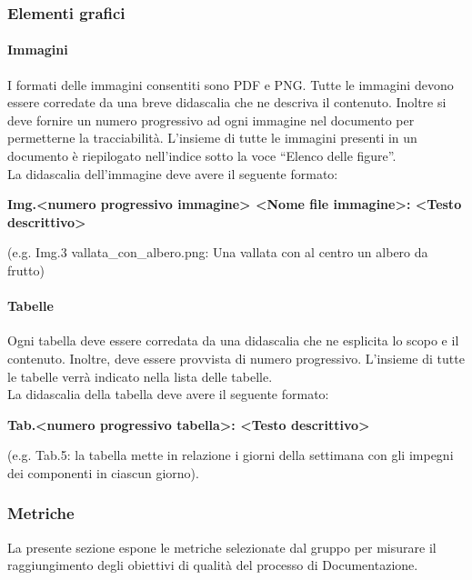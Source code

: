 		\subsubsection{Elementi grafici}
			\paragraph{Immagini}
				I formati delle immagini consentiti sono PDF e PNG. Tutte le immagini devono essere corredate da una breve didascalia che ne descriva il contenuto. Inoltre si deve fornire un numero progressivo ad ogni immagine nel documento per permetterne la tracciabilità. L’insieme di tutte le immagini presenti in un documento è riepilogato nell'indice sotto la voce “Elenco delle figure”. \\
				La didascalia dell’immagine deve avere il seguente formato:
				\begin{center}
					\textbf{Img.<numero progressivo immagine> <Nome file immagine>: <Testo descrittivo>}
				\end{center}
				(e.g.  Img.3 vallata\_con\_albero.png: Una vallata con al centro un albero da frutto)
			\paragraph{Tabelle}
				Ogni tabella deve essere corredata da una didascalia che ne esplicita lo scopo e il contenuto. Inoltre, deve essere provvista di numero progressivo. L’insieme di tutte le tabelle verrà indicato nella lista delle tabelle. \\
				La didascalia della tabella deve avere il seguente formato: \\
				\begin{center}
					\textbf{Tab.<numero progressivo tabella>: <Testo descrittivo>}
				\end{center}
				(e.g. Tab.5: la tabella mette in relazione i giorni della settimana con gli impegni dei componenti in ciascun giorno).

		\subsubsection{Metriche}
			La presente sezione espone le metriche selezionate dal gruppo per misurare il raggiungimento degli obiettivi di qualità del processo di Documentazione. \\
